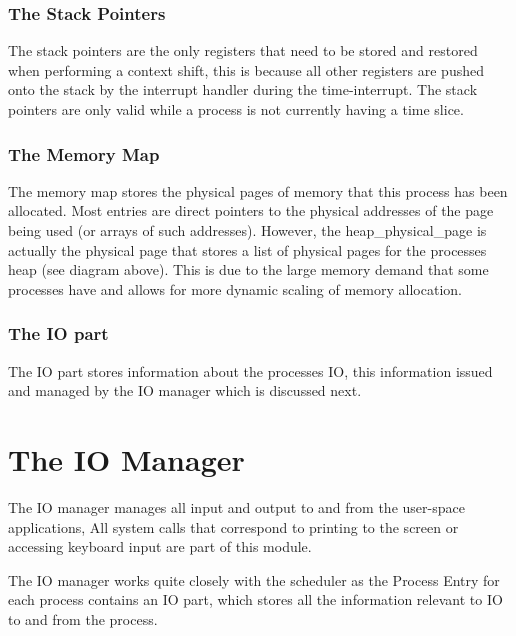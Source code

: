 \documentclass[a4paper]{report}
\begin{document}
\subsubsection{The Stack Pointers}
The stack pointers are the only registers that need to be stored and restored when performing a context shift, this is because all other registers are pushed onto the stack by the interrupt handler during the time-interrupt. The stack pointers are only valid while a process is not currently having a time slice.

\subsubsection{The Memory Map}

The memory map stores the physical pages of memory that this process has been allocated. Most entries are direct pointers to the physical addresses of the page being used (or arrays of such addresses). However, the heap\_physical\_page is actually the physical page that stores a list of physical pages for the processes heap (see diagram above). This is due to the large memory demand that some processes have and allows for more dynamic scaling of memory allocation.

\subsubsection{The IO part}

The IO part stores information about the processes IO, this information issued and managed by the IO manager which is discussed next.



















\clearpage

\section{The IO Manager}

The IO manager manages all input and output to and from the user-space applications, All system calls that correspond to printing to the screen or accessing keyboard input are part of this module.

The IO manager works quite closely with the scheduler as the Process Entry for each process contains an IO part, which stores all the information relevant to IO to and from the process.
\end{document}
